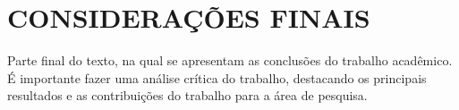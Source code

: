 
\chapter{CONSIDERAÇÕES FINAIS}
\label{chap:conclusao}

Parte final do texto, na qual se apresentam as conclusões do trabalho
acadêmico. É importante fazer uma análise crítica do trabalho, destacando os
principais resultados e as contribuições do trabalho para a área de pesquisa.
